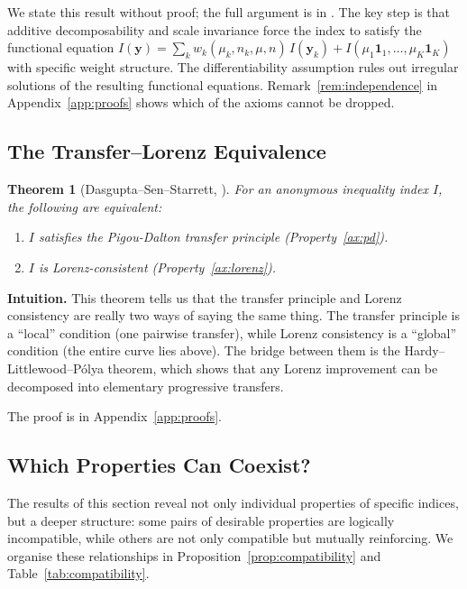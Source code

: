 \documentclass[12pt]{article}
\theoremstyle{plain}
\newtheorem{theorem}{Theorem}
\theoremstyle{definition}
\theoremstyle{remark}
\newcommand{\bfy}{\mathbf{y}}
\newcommand{\bfone}{\mathbf{1}}
\begin{document}
We state this result without proof; the full argument is in \citet{Shorrocks1980}.
The key step is that additive decomposability and scale invariance force the index to satisfy the functional equation $I(\bfy) = \sum_k w_k(\mu_k, n_k, \mu, n)\,I(\bfy_k) + I(\mu_1\bfone_1, \ldots, \mu_K\bfone_K)$ with specific weight structure.
The differentiability assumption rules out irregular solutions of the resulting functional equations.
Remark~\ref{rem:independence} in Appendix~\ref{app:proofs} shows which of the axioms cannot be dropped.



\subsection{The Transfer--Lorenz Equivalence}

\begin{theorem}[Dasgupta--Sen--Starrett, \citealp{DasGupta1973}]\label{thm:dss}
For an anonymous inequality index $I$, the following are equivalent:
\begin{enumerate}[label=(\roman*)]
    \item $I$ satisfies the Pigou-Dalton transfer principle (Property~\ref{ax:pd}).
    \item $I$ is Lorenz-consistent (Property~\ref{ax:lorenz}).
\end{enumerate}
\end{theorem}

\textbf{Intuition.}
This theorem tells us that the transfer principle and Lorenz consistency are really two ways of saying the same thing.
The transfer principle is a ``local'' condition (one pairwise transfer), while Lorenz consistency is a ``global'' condition (the entire curve lies above).
The bridge between them is the Hardy--Littlewood--P\'olya theorem, which shows that any Lorenz improvement can be decomposed into elementary progressive transfers.

The proof is in Appendix~\ref{app:proofs}.

\subsection{Which Properties Can Coexist?}\label{sec:compatibility}

The results of this section reveal not only individual properties of specific indices, but a deeper structure: some pairs of desirable properties are logically incompatible, while others are not only compatible but mutually reinforcing.
We organise these relationships in Proposition~\ref{prop:compatibility} and Table~\ref{tab:compatibility}.
\end{document}
